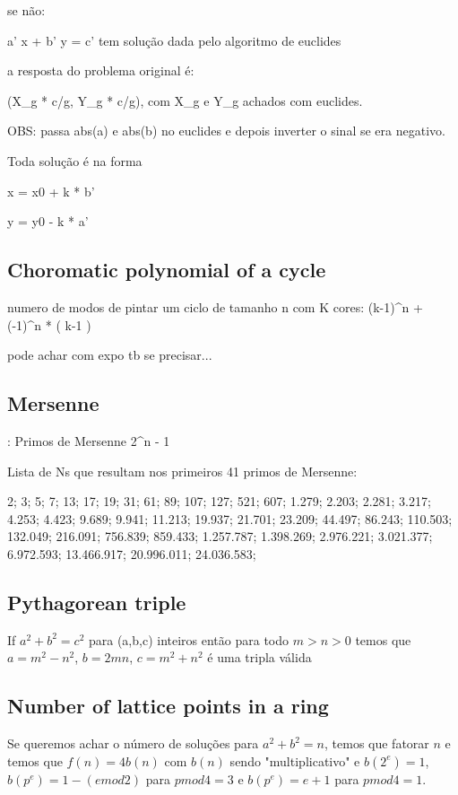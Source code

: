 \documentclass{article}
\begin{document}
se não:

a' x + b' y = c' tem solução dada pelo algoritmo de euclides

a resposta do problema original é:

(X_g * c/g, Y_g * c/g), com X_g e Y_g achados com euclides.

OBS: passa abs(a) e abs(b) no euclides e depois inverter o sinal
se era negativo.

Toda solução é na forma

x = x0 + k * b'

y = y0 - k * a'

\subsection{Choromatic polynomial of a cycle}

numero de modos de pintar um ciclo de tamanho n com K cores: (k-1)^n + (-1)^n * ( k-1 )

pode achar com expo tb se precisar...


\subsection{Mersenne}:
Primos de Mersenne 2^n - 1

Lista de Ns que resultam nos primeiros 41 primos de Mersenne:

2; 3; 5; 7; 13; 17; 19; 31; 61; 89; 107; 127; 521; 607; 1.279; 2.203; 2.281; 3.217; 4.253; 4.423; 9.689; 9.941; 11.213; 19.937; 21.701; 23.209; 44.497; 86.243; 110.503; 132.049; 216.091; 756.839; 859.433; 1.257.787; 1.398.269; 2.976.221; 3.021.377; 6.972.593; 13.466.917; 20.996.011; 24.036.583;


\subsection{Pythagorean triple}
If $a^2 +  b^2 = c^2$ para (a,b,c) inteiros então para todo $m>n>0$ temos que $a = m^2 - n^2$, $b=2mn$, $c = m^2 + n^2$ é uma tripla válida

\subsection{Number of lattice points in a ring}
Se queremos achar o número de soluções para $a^2 + b^2 = n$, temos que fatorar $n$ e temos que $f(n) = 4b(n)$ com $b(n)$ sendo "multiplicativo" e $b(2^e) = 1$, $b(p^e) = 1 - (e mod 2)$ para $p mod 4 = 3$ e $b(p^e) = e+1$ para $p mod 4 = 1$.
\end{document}
